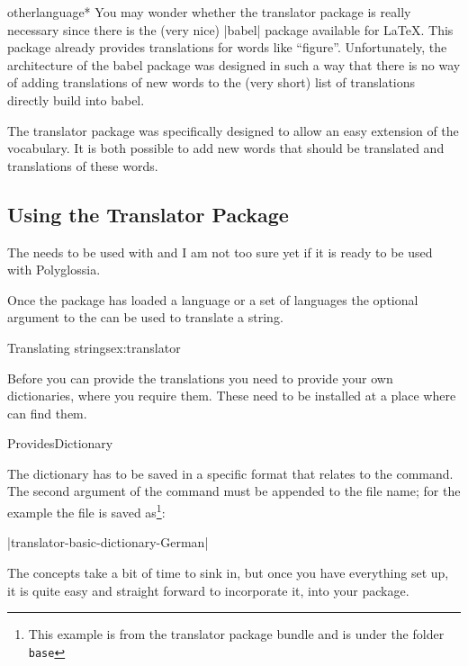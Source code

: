 \begin{docCommandd}{otherlanguage*} { }
You may wonder whether the translator package is really necessary
since there is the (very nice) |babel| package available for
\LaTeX. This package already provides translations for words like
``figure''. Unfortunately, the architecture of the babel package was
designed in such a way that there is no way of adding translations of
new words to the (very short) list of translations directly build into
babel.

The translator package was specifically designed to allow an easy
extension of the vocabulary. It is both possible to add new words that
should be translated and translations of these words.

\subsection{Using the Translator Package}

  The  needs to be used with  and I am not too sure yet 
  if it is ready  to be used with Polyglossia.

Once the package has loaded a language or a set of languages the optional argument to the
\cmd{\translate} can be used to translate a string. 

\begin{texexample}{Translating strings}{ex:translator}
\end{texexample}

Before you can provide the translations you need to provide your own dictionaries, where you require them. These need to be installed at a place where \tex can find them.

\begin{docCmd} {ProvidesDictionary} {   }
\end{docCmd}

The dictionary has to be saved in a specific format that relates to the  command. The second argument of the command must be appended to the file name; for the example the file is saved as\footnote{This  example is from the translator package bundle and is under the folder \texttt{base}}:

|translator-basic-dictionary-German|

The concepts take a bit of time to sink in, but once you have everything set up, it is quite easy and straight forward to incorporate it, into your package. 


\end{docCommandd}

